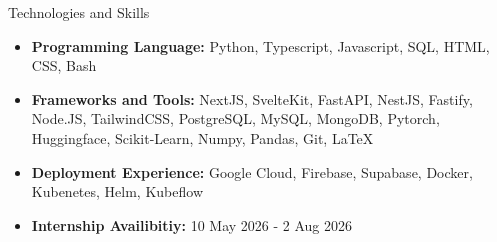 \documentclass[]{mcdowellcv}
\begin{document}
	\begin{cvsection}{Technologies and Skills}
		\begin{cvsubsection}{}{}{}	
			\begin{itemize}
				\item \textbf{Programming Language: } Python, Typescript, Javascript, SQL, HTML, CSS, Bash
				\item \textbf{Frameworks and Tools: } NextJS, SvelteKit, FastAPI, NestJS, Fastify, Node.JS, TailwindCSS, PostgreSQL, MySQL, MongoDB, Pytorch, Huggingface, Scikit-Learn, Numpy, Pandas, Git, \LaTeX
				\item \textbf{Deployment Experience: } Google Cloud, Firebase, Supabase, Docker, Kubenetes, Helm, Kubeflow
				\item \textbf{Internship Availibitiy: } 10 May 2026 - 2 Aug 2026
			\end{itemize}
		\end{cvsubsection}
	\end{cvsection}
	
\end{document}
